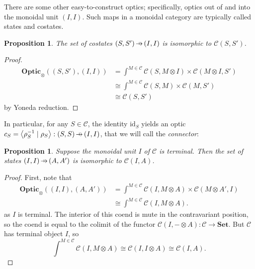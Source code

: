 \documentclass[11pt,letterpaper]{article}
\theoremstyle{plain}
\newtheorem{proposition}[theorem]{Proposition}
\theoremstyle{definition}
\newcommand{\C}{\mathscr{C}}
\newcommand{\Set}{\mathbf{Set}}
\newcommand{\Optic}{\mathbf{Optic}}
\newcommand{\id}{\mathrm{id}}
\newcommand{\rep}[2]{{\ensuremath \left\langle #1 \mid #2 \right\rangle}}
\newcommand{\hto}{\ensuremath{\,\mathaccent\shortmid\rightarrow\,}}
\newcommand{\todo}[1]{\textcolor{red}{\small #1}}
\begin{document}
There are some other easy-to-construct optics; specifically, optics out of  and into the monoidal unit $(I, I)$. Such maps in a monoidal category are typically called states and costates.
\begin{proposition}\label{prop:costates}
  The set of costates $(S, S') \hto (I, I)$ is isomorphic to $\C(S, S')$.
\end{proposition}
\begin{proof}
  \begin{align*}
    \Optic_\otimes((S, S'), (I, I))
    &= \int^{M \in \C} \C(S, M \otimes I) \times \C(M \otimes I, S') \\
    &\cong \int^{M \in \C} \C(S, M) \times \C(M, S') \\
    &\cong \C(S, S')
  \end{align*}
  by Yoneda reduction.
\end{proof}


In particular, for any $S \in \C$, the identity $\id_S$ yields an optic $c_S = \rep{\rho_S^{-1}}{\rho_S} : (S, S) \hto (I, I)$, that we will call the \emph{connector}:
%  
\begin{center}
  
\end{center}

\begin{proposition}
  Suppose the monoidal unit $I$ of $\C$ is terminal. Then the set of states $(I, I) \hto (A, A')$ is isomorphic to $\C(I, A)$.
\end{proposition}
\begin{proof}
  First, note that
  \begin{align*}
    \Optic_\otimes((I,I), (A,A'))
    &= \int^{M \in \C} \C(I, M \otimes A) \times \C(M \otimes A', I) \\
    &\cong \int^{M \in \C} \C(I, M \otimes A).
  \end{align*}
  as $I$ is terminal. The interior of this coend is mute in the contravariant position, so the coend is equal to the colimit of the functor $\C(I, - \otimes A) : \C \to \Set$. But $\C$ has terminal object $I$, so \[\int^{M \in \C} \C(I, M \otimes A) \cong \C(I, I \otimes A) \cong \C(I, A).\]
\end{proof}
\end{document}
